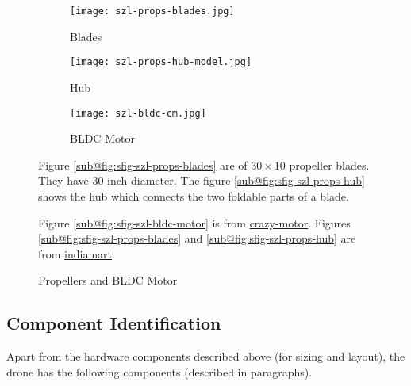 \begin{figure}[ht]
    \centering
    \begin{subfigure}[b]{0.3\textwidth}
        \centering
        \texttt{[image: szl-props-blades.jpg]}
        \caption{Blades}
        \label{fig:sfig-szl-props-blades}
    \end{subfigure}
    \begin{subfigure}[b]{0.3\textwidth}
        \texttt{[image: szl-props-hub-model.jpg]}
        \caption{Hub}
        \label{fig:sfig-szl-props-hub}
    \end{subfigure}
    \begin{subfigure}[b]{0.3\textwidth}
        \texttt{[image: szl-bldc-cm.jpg]}
        \caption{BLDC Motor}
        \label{fig:sfig-szl-bldc-motor}
    \end{subfigure}
    \caption{Propellers and BLDC Motor}
    \label{fig:szl-props-motor}
    \small
        Figure \ref{sub@fig:sfig-szl-props-blades} are of $30\times10$ propeller blades. They have $30$ inch diameter. The figure \ref{sub@fig:sfig-szl-props-hub} shows the hub which connects the two foldable parts of a blade.

        Figure \ref{sub@fig:sfig-szl-bldc-motor} is from \href{http://crazy-motor.com/pd.jsp?id=41#_pp=109_336}{crazy-motor}. Figures \ref{sub@fig:sfig-szl-props-blades} and \ref{sub@fig:sfig-szl-props-hub} are from \href{https://www.indiamart.com/proddetail/30-inch-foldable-carbon-fiber-propellers-21885512848.html}{indiamart}.
\end{figure}

\subsection{Component Identification}

Apart from the hardware components described above (for sizing and layout), the drone has the following components (described in paragraphs).

